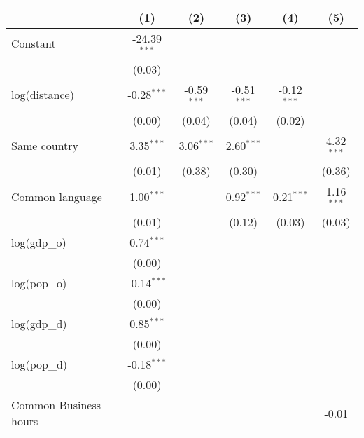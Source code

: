 
\begingroup
\centering
\small
\begin{tabular}{lccccc}
   \toprule
                            & (1)            & (2)           & (3)           & (4)           & (5)\\  
   \midrule 
   Constant                 & -24.39$^{***}$ &               &               &               &   \\   
                            & (0.03)         &               &               &               &   \\   
   log(distance)            & -0.28$^{***}$  & -0.59$^{***}$ & -0.51$^{***}$ & -0.12$^{***}$ &   \\   
                            & (0.00)         & (0.04)        & (0.04)        & (0.02)        &   \\   
   Same country             & 3.35$^{***}$   & 3.06$^{***}$  & 2.60$^{***}$  &               & 4.32$^{***}$\\   
                            & (0.01)         & (0.38)        & (0.30)        &               & (0.36)\\   
   Common language          & 1.00$^{***}$   &               & 0.92$^{***}$  & 0.21$^{***}$  & 1.16$^{***}$\\   
                            & (0.01)         &               & (0.12)        & (0.03)        & (0.03)\\   
   log(gdp\_o)              & 0.74$^{***}$   &               &               &               &   \\   
                            & (0.00)         &               &               &               &   \\   
   log(pop\_o)              & -0.14$^{***}$  &               &               &               &   \\   
                            & (0.00)         &               &               &               &   \\   
   log(gdp\_d)              & 0.85$^{***}$   &               &               &               &   \\   
                            & (0.00)         &               &               &               &   \\   
   log(pop\_d)              & -0.18$^{***}$  &               &               &               &   \\   
                            & (0.00)         &               &               &               &   \\   
   Common Business hours    &                &               &               &               & -0.01\\   

\end{tabular}
